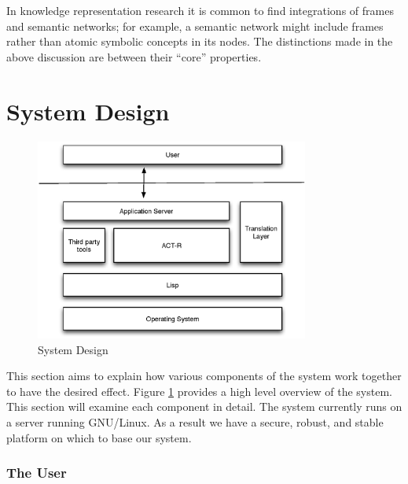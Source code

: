 In knowledge representation research it is common to find integrations
of frames and semantic networks; for example, a semantic network might
include frames rather than atomic symbolic concepts in its nodes.  The
distinctions made in the above discussion are between their ``core''
properties.



\section{System Design}

\begin{figure}[htp]
  \centering
  \includegraphics[width=90mm]{SystemOverview}
  \caption{System Design}
  \label{SysOverview}
\end{figure}

This section aims to explain how various components of the system work
together to have the desired effect. Figure \ref{SysOverview} provides
a high level overview of the system.  This section will examine each
component in detail.  The system currently runs on a server running
GNU\slash Linux.  As a result we have a secure, robust, and stable
platform on which to base our system.


\subsubsection{The User}

